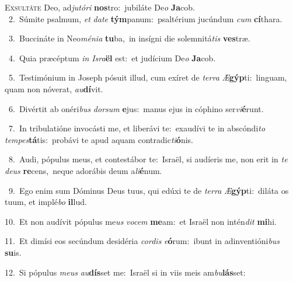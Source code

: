 \lettrine{\initial\textcolor{\initialcolor}{E}}{xsultáte} Deo, ad\-\textit{ju}\-\textit{tó}\textit{ri} \textbf{nos}\-tro:~\star jubiláte De\textit{o} \textbf{Ja}\-cob.\\
{\numbfont\textcolor{\numbcolor}{~2.}}~Súmite psalmum, \textit{et} \textit{da}\-\textit{te} \textbf{tým}\-panum:~\star psaltérium jucúndum \textit{cum} \textbf{cí}\-thara.\par
{\numbfont\textcolor{\numbcolor}{~3.}}~Buccináte in Neo\-\textit{mé}\-\textit{ni}\textit{a} \textbf{tu}\-ba,~\star in insígni die solemnitá\textit{tis} \textbf{ves}\-træ.\par
{\numbfont\textcolor{\numbcolor}{~4.}}~Quia præcéptum \textit{in} \textit{Is}\-\textit{ra}\textbf{ël} est:~\star et judícium De\textit{o} \textbf{Ja}\-cob.\par
{\numbfont\textcolor{\numbcolor}{~5.}}~Testimónium in Joseph pósuit illud, cum exíret de \textit{ter}\-\textit{ra} \textit{Æ}\-\textbf{gýp}ti:~\star linguam, quam non nóverat, \textit{au}\-\textbf{dí}vit.\par
{\numbfont\textcolor{\numbcolor}{~6.}}~Divértit ab onéri\textit{bus} \textit{dor}\-\textit{sum} \textbf{e}\-jus:~\star manus ejus in cóphino ser\-\textit{vi}\-\textbf{é}runt.\par
{\numbfont\textcolor{\numbcolor}{~7.}}~In tribulatióne invocásti me, et liberávi te:~\dagger exaudívi te in abscóndi\textit{to} \textit{tem}\-\textit{pes}\textbf{tá}tis:~\star probávi te apud aquam contradic\-\textit{ti}\-\textbf{ó}nis.\par
{\numbfont\textcolor{\numbcolor}{~8.}}~Audi, pópulus meus, et contestábor te:~\dagger Israël, si audíeris me, non erit in \textit{te} \textit{de}\-\textit{us} \textbf{re}\-cens,~\star neque adorábis deum a\-\textit{li}\-\textbf{é}num.\par
{\numbfont\textcolor{\numbcolor}{~9.}}~Ego enim sum Dóminus Deus tuus, qui edúxi te de \textit{ter}\-\textit{ra} \textit{Æ}\-\textbf{gýp}ti:~\star diláta os tuum, et implé\textit{bo} \textbf{il}\-lud.\par
{\numbfont\textcolor{\numbcolor}{10.}}~Et non audívit pópulus me\textit{us} \textit{vo}\-\textit{cem} \textbf{me}\-am:~\star et Israël non intén\textit{dit} \textbf{mi}\-hi.\par
{\numbfont\textcolor{\numbcolor}{11.}}~Et dimísi eos secúndum desidéria \textit{cor}\-\textit{dis} \textit{e}\-\textbf{ó}rum:~\star ibunt in adinventióni\textit{bus} \textbf{su}\-is.\par
{\numbfont\textcolor{\numbcolor}{12.}}~Si pópulus \textit{me}\-\textit{us} \textit{au}\-\textbf{dís}set me:~\star Israël si in viis meis am\-\textit{bu}\-\textbf{lás}set:\par
